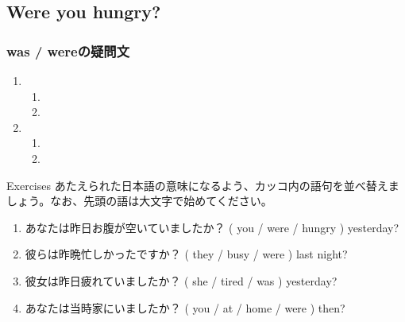 \documentclass[aspectratio=169,xcolor={dvipsnames,table}]{beamer}
\newcommand{\myaudio}[1]{\href{#1}{\faVolumeUp}}
\begin{document}
\subsection{Were you hungry?}
\begin{frame}[plain]\frametitle{was / wereの疑問文}
\Large

\begin{enumerate}
 \item \begin{enumerate}\Large
	\item {}
	\item {}
       \end{enumerate}
 \item \begin{enumerate}\Large
	\item {}
	\item {}
       \end{enumerate}
\end{enumerate}


\hfill\myaudio{./audio/024_past_be_06.pdf}

\end{frame}


\begin{frame}[plain]{Exercises}
あたえられた日本語の意味になるよう、カッコ内の語句を並べ替えましょう。なお、先頭の語は大文字で始めてください。 
 \begin{enumerate}
	    \item あなたは昨日お腹が空いていましたか？
( you / were / hungry ) yesterday?\\
    \item 彼らは昨晩忙しかったですか？
( they / busy / were ) last night?\\
	    \item 彼女は昨日疲れていましたか？
( she / tired / was ) yesterday?\\
	    \item あなたは当時家にいましたか？
( you / at / home / were ) then?\\

 \end{enumerate}
\hfill\myaudio{./audio/024_past_be_07.pdf}

\end{frame}
\end{document}
